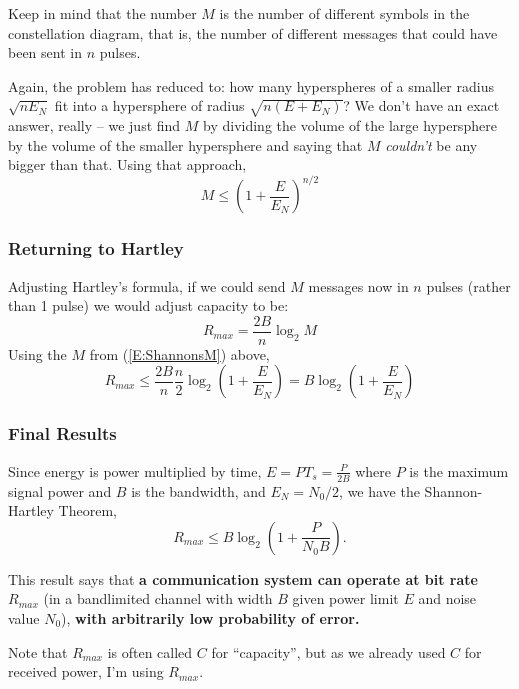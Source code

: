 Keep in mind that the number $M$ is the number of different symbols in the constellation diagram, that is, the number of different messages that could have been sent in $n$ pulses.  

Again, the problem has reduced to: how many hyperspheres of a smaller radius $\sqrt{nE_N}$ fit into a hypersphere of radius $\sqrt{n(E + E_N)}$?  We don't have an exact answer, really -- we just find $M$ by dividing the volume of the large hypersphere by the volume of the smaller hypersphere and saying that $M$ \emph{couldn't} be any bigger than that.   Using that approach,
\begin{equation} \label{E:ShannonsM}
  M \le \left( 1 + \frac{E}{E_N}\right)^{n/2}
\end{equation}

\subsubsection{Returning to Hartley}
Adjusting Hartley's formula, if we could send $M$ messages now in
$n$ pulses (rather than 1 pulse) we would adjust capacity to be:
\[
   R_{max} = \frac{2B}{n}  \log_2 M
\]
Using the $M$ from (\ref{E:ShannonsM}) above,
\begin{equation}
   R_{max} \le \frac{2B}{n} \frac{n}{2} \log_2 \left( 1 + \frac{E}{E_N}\right)
   = B \log_2 \left( 1 + \frac{E}{E_N}\right)
     \nonumber
\end{equation}

\subsubsection{Final Results}

Since energy is power multiplied by time, $E=P T_s = \frac{P}{2B}$ where
$P$ is the maximum signal power and $B$ is the bandwidth, and $E_N =
N_0/2$, we have the Shannon-Hartley Theorem,
\begin{equation} \label{E:ShannonHartley2}
  R_{max} \le B \log_2 \left( 1 + \frac{P}{N_0 B}\right).
\end{equation}

This result says that \textbf{a communication system can operate at
bit rate} $R_{max}$ (in a bandlimited channel with width $B$ given power
limit $E$ and noise value $N_0$), \textbf{with arbitrarily low
probability of error.} 

Note that $R_{max}$ is often called $C$ for ``capacity'', but as we already used $C$ for received power, I'm using $R_{max}$.


